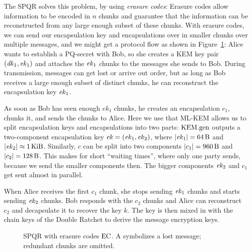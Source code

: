 The SPQR solves this problem, by using \emph{erasure codes}:
Erasure codes allow information to be encoded in $n$ chunks and guarantee that the information can be reconstructed from any large enough subset of these chunks.
With erasure codes, we can send our encapsulation key and encapsulations over in smaller chunks over multiple messages, and we might get a protocol flow as shown in Figure~\ref{fig:double-ratchet:triple-ratchet}:
Alice wants to establish a PQ-secret with Bob, so she creates a KEM key pair $(\mathit{dk}_1, \mathit{ek}_1)$ and attaches the $\mathit{ek}_1$ chunks to the messages she sends to Bob.
During transmission, messages can get lost or arrive out order, but as long as Bob receives a large enough subset of distinct chunks, he can reconstruct the encapsulation key $\mathit{ek}_1$.

As soon as Bob has seen enough $ek_1$ chunks, he creates an encapsulation $c_1$, chunks it, and sends the chunks to Alice.
Here we use that ML-KEM allows us to split encapsulation keys and encapsulations into two parts:
$\mathrm{KEM}.\mathrm{gen}$ outputs a two-component encapsulation key $\mathit{ek}=(\mathit{ek}_1, \mathit{ek}_2)$, where $|\ek_1| = \qty{64}{\byte}$ and $|\ek_2|\approx \qty{1}{\kibi\byte}$.
Similarly, $c$ can be split into two components $|c_1|=\qty{960}{\byte}$ and $|c_2|=\qty{128}{\byte}$.
This makes for short ``waiting times'', where only one party sends, because we send the smaller components then.
The bigger components $\mathit{ek}_2$ and $c_1$ get sent almost in parallel.

When Alice receives the first $c_1$ chunk, she stops sending $\mathit{ek}_1$ chunks and starts sending $\mathit{ek}_2$ chunks.
Bob responds with the $c_2$ chunks and Alice can reconstruct $c_2$ and decapsulate it to recover the key $k$.
The key is then mixed in with the chain keys of the Double Ratchet to derive the message encryption keys.

\begin{figure}
   \centering
   
   \caption{SPQR with erasure codes $\mathrm{EC}$. A \lostmark{} symbolizes a lost message; redundant chunks are omitted.}\label{fig:double-ratchet:triple-ratchet}
\end{figure}

